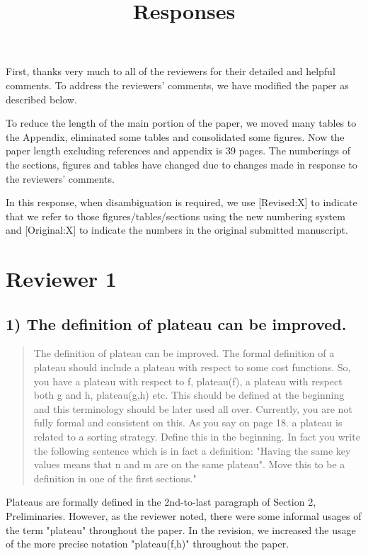 \documentclass{article}
\date{}
\title{Responses}
\begin{document}
\maketitle
First, thanks very much to all of the reviewers for their detailed and helpful comments.
To address the reviewers' comments, we have modified the paper as described below.

To reduce the length of the main portion of the paper, we moved many tables to the Appendix, 
eliminated some tables and consolidated some figures.
Now the paper length excluding references and appendix is 39 pages.
The numberings of the sections, figures and tables have changed due to changes made in response to the reviewers' comments.

In this response, when disambiguation is required, we use [Revised:X] to indicate that we refer to those figures/tables/sections using
the new numbering system and [Original:X] to indicate the numbers in the original submitted manuscript.

\section{Reviewer 1}
\label{sec:orgheadline13}

\subsection{1) The definition of plateau can be improved.}
\label{sec:orgheadline1}

\begin{quote}
The definition of plateau can be improved. The formal definition of
a plateau should include a plateau with respect to some cost
functions. So, you have a plateau with respect to f, plateau(f), a
plateau with respect both g and h, plateau(g,h) etc. This should be
defined at the beginning and this terminology should be later used all
over. Currently, you are not fully formal and consistent on this. As
you say on page 18. a plateau is related to a sorting strategy. Define
this in the beginning. In fact you write the following sentence which
is in fact a definition: "Having the same key values means that n and
m are on the same plateau". Move this to be a definition in one of the
first sections."
\end{quote}

Plateaus are formally defined in the 2nd-to-last paragraph of Section 2, Preliminaries.
However, as the reviewer noted, there were some informal usages of the term "plateau" throughout the paper.
In the revision, we increased the usage of the more precise notation "plateau(f,h)" throughout the paper.
\end{document}
